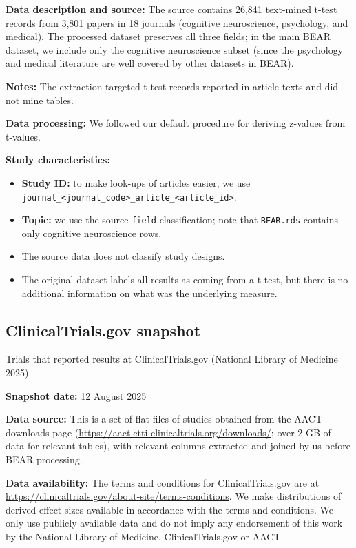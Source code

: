\documentclass[
  11pt,
]{article}
\providecommand{\tightlist}{%
  \setlength{\itemsep}{0pt}\setlength{\parskip}{0pt}}
\begin{document}
\textbf{Data description and source:} The source contains 26,841
text-mined t-test records from 3,801 papers in 18 journals (cognitive
neuroscience, psychology, and medical). The processed dataset preserves
all three fields; in the main BEAR dataset, we include only the
cognitive neuroscience subset (since the psychology and medical
literature are well covered by other datasets in BEAR).

\textbf{Notes:} The extraction targeted t-test records reported in
article texts and did not mine tables.

\textbf{Data processing:} We followed our default procedure for deriving
z-values from t-values.

\textbf{Study characteristics:}

\begin{itemize}
\tightlist
\item
  \textbf{Study ID:} to make look-ups of articles easier, we use
  \texttt{journal\_\textless{}journal\_code\textgreater{}\_article\_\textless{}article\_id\textgreater{}}.
\item
  \textbf{Topic:} we use the source \texttt{field} classification; note
  that \texttt{BEAR.rds} contains only cognitive neuroscience rows.
\item
  The source data does not classify study designs.
\item
  The original dataset labels all results as coming from a t-test, but
  there is no additional information on what was the underlying measure.
\end{itemize}

\newpage

\subsection{ClinicalTrials.gov
snapshot}\label{clinicaltrials.gov-snapshot}

Trials that reported results at ClinicalTrials.gov (National Library of
Medicine 2025).

\textbf{Snapshot date:} 12 August 2025

\textbf{Data source:} This is a set of flat files of studies obtained
from the AACT downloads page
(\url{https://aact.ctti-clinicaltrials.org/downloads/}; over 2 GB of
data for relevant tables), with relevant columns extracted and joined by
us before BEAR processing.

\textbf{Data availability:} The terms and conditions for
ClinicalTrials.gov are at
\url{https://clinicaltrials.gov/about-site/terms-conditions}. We make
distributions of derived effect sizes available in accordance with the
terms and conditions. We only use publicly available data and do not
imply any endorsement of this work by the National Library of Medicine,
ClinicalTrials.gov or AACT.
\end{document}
